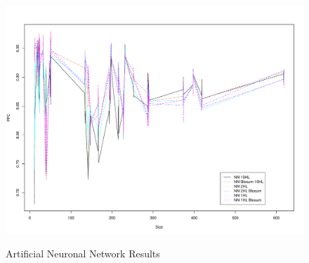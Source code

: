\begin{figure}
\begin{center}
\includegraphics[width=12cm]{fig/ann1.pdf}
\label{fig:ann1}
\caption{Artificial Neuronal Network Results}
\end{center}
\end{figure}

